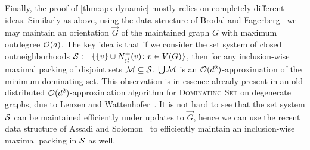 Finally, the proof of \cref{thm:apx-dynamic} mostly relies on completely different ideas. Similarly as above, using the data structure of Brodal and Fagerberg~\cite{BrodalF99} we may maintain an orientation $\vec G$ of the maintained graph $G$ with maximum outdegree $\Oh(d)$. The key idea is that if we consider the set system of closed outneighborhoods $\Ss\coloneqq \{\{v\}\cup N^+_{\vec G}(v)\colon v\in V(G)\}$, then for any inclusion-wise maximal packing of disjoint sets ${\cal M}\subseteq \Ss$, $\bigcup {\cal M}$ is an $\Oh(d^2)$-approximation of the minimum dominating set. This observation is in essence already present in an old distributed $\Oh(d^2)$-approximation algorithm for \textsc{Dominating Set} on degenerate graphs, due to Lenzen and Wattenhofer~\cite{LenzenW10}. It is not hard to see that the set system $\Ss$ can be maintained efficiently under updates to $\vec G$, hence we can use the recent data structure of Assadi and Solomon~\cite{AssadiSolomon21} to efficiently maintain an inclusion-wise maximal packing in $\Ss$ as well.

